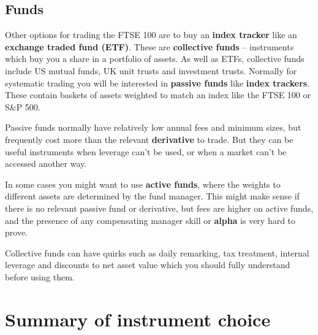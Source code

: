\subsection*{Funds}

Other options for trading the FTSE 100 are to buy an \textbf{index tracker} like an \textbf{exchange traded fund (ETF)}. These are \textbf{collective funds} -- instruments which buy you a share in a portfolio of assets. As well as ETFs, collective funds include US mutual funds, UK unit trusts and investment trusts. Normally for systematic trading you will be interested in \textbf{passive funds} like \textbf{index trackers}. These contain baskets of assets weighted to match an index like the FTSE 100 or S\&P 500.

Passive funds normally have relatively low annual fees and minimum sizes, but frequently cost more than the relevant \textbf{derivative} to trade. But they can be useful instruments when leverage can't be used, or when a market can't be accessed another way.

In some cases you might want to use \textbf{active funds}, where the weights to different assets are determined by the fund manager. This might make sense if there is no relevant passive fund or derivative, but fees are higher on active funds, and the presence of any compensating manager skill or \textbf{alpha} is very hard to prove.

Collective funds can have quirks such as daily remarking, tax treatment, internal leverage and discounts to net asset value which you should fully understand before using them.

\section*{Summary of instrument choice}  {}

